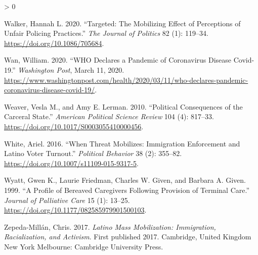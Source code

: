 \documentclass[
  12pt,
]{article}
\newlength{\cslhangindent}
\newenvironment{CSLReferences}[2] %
 {%
  \setlength{\parindent}{0pt}
  \ifodd #1 \everypar{\setlength{\hangindent}{\cslhangindent}}\ignorespaces\fi
  \ifnum #2 > 0
  \setlength{\parskip}{#2\baselineskip}
  \fi
 }%
 {}
\begin{document}
\begin{CSLReferences}{1}{0}
\leavevmode\hypertarget{ref-Walker2020}{}%
Walker, Hannah L. 2020. {``Targeted: {The Mobilizing Effect} of {Perceptions} of {Unfair Policing Practices}.''} \emph{The Journal of Politics} 82 (1): 119--34. \url{https://doi.org/10.1086/705684}.

\leavevmode\hypertarget{ref-Wan2020}{}%
Wan, William. 2020. {``{WHO} Declares a Pandemic of Coronavirus Disease Covid-19.''} \emph{Washington Post}, March 11, 2020. \url{https://www.washingtonpost.com/health/2020/03/11/who-declares-pandemic-coronavirus-disease-covid-19/}.

\leavevmode\hypertarget{ref-Weaver2010}{}%
Weaver, Vesla M., and Amy E. Lerman. 2010. {``Political {Consequences} of the {Carceral State}.''} \emph{American Political Science Review} 104 (4): 817--33. \url{https://doi.org/10.1017/S0003055410000456}.

\leavevmode\hypertarget{ref-White2016}{}%
White, Ariel. 2016. {``When {Threat Mobilizes}: {Immigration Enforcement} and {Latino Voter Turnout}.''} \emph{Political Behavior} 38 (2): 355--82. \url{https://doi.org/10.1007/s11109-015-9317-5}.

\leavevmode\hypertarget{ref-Wyatt1999}{}%
Wyatt, Gwen K., Laurie Friedman, Charles W. Given, and Barbara A. Given. 1999. {``A {Profile} of {Bereaved Caregivers} Following {Provision} of {Terminal Care}.''} \emph{Journal of Palliative Care} 15 (1): 13--25. \url{https://doi.org/10.1177/082585979901500103}.

\leavevmode\hypertarget{ref-Zepeda-Millan2017}{}%
Zepeda-Millán, Chris. 2017. \emph{Latino Mass Mobilization: Immigration, Racialization, and Activism}. First published 2017. {Cambridge, United Kingdom New York Melbourne}: {Cambridge University Press}.

\end{CSLReferences}
\end{document}
